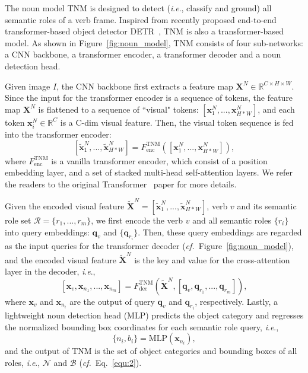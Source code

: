 \documentclass[letterpaper]{article} %
\newcommand{\ie}{\textit{i}.\textit{e}.}
\newcommand{\cf}{\textit{cf.}}
\begin{document}
The noun model TNM is designed to detect (\ie, classify and ground) all semantic roles of a verb frame. Inspired from recently proposed end-to-end transformer-based object detector DETR~\cite{carion2020end}, TNM is also a transformer-based model. As shown in Figure~\ref{fig:noun_model}, TNM consists of four sub-networks: a CNN backbone, a transformer encoder, a transformer decoder and a noun detection head.

Given image $I$, the CNN backbone first extracts a feature map $\bm{X}^N \in\mathbb{R}^{C \times {H} \times {W}}$. Since the input for the transformer encoder is a sequence of tokens, the feature map $\bm{X}^N$ is flattened to a sequence of ``visual" tokens: $[\bm{x}^N_1, ..., \bm{x}^N_{H*W}]$, and each token $\bm{x}^N_i \in \mathbb{R}^C$ is a C-dim visual feature. Then, the visual token sequence is fed into the transformer encoder:
\begin{equation}
    \left[ \tilde{\bm{x}}^N_1, ..., \tilde{\bm{x}}^N_{H*W} \right] = F^{\text{TNM}}_{\text{enc}} (\left[\bm{x}^N_1, ..., \bm{x}^N_{H*W} \right]),
\end{equation}
where $F^{\text{TNM}}_{\text{enc}}$ is a vanilla transformer encoder, which consist of a position embedding layer, and a set of stacked multi-head self-attention layers. We refer the readers to the original Transformer~\cite{vaswani2017attention} paper for more details.


Given the encoded visual feature $\tilde{\bm{X}}^N = [\tilde{\bm{x}}^N_1, ..., \tilde{\bm{x}}^N_{H*W} ]$, verb $v$ and its semantic role set $\mathcal{R}=\{r_1,...,r_m\}$, we first encode the verb $v$ and all semantic roles $\{r_i\}$ into query embeddings: $\bm{q}_v$ and $\{\bm{q}_{r_i}\}$. Then, these query embeddings are regarded as the input queries for the transformer decoder (\cf~Figure~\ref{fig:noun_model}), and the encoded visual feature $\tilde{\bm{X}}^N$ is the key and value for the cross-attention layer in the decoder, \ie, 
\begin{equation} \label{equ:4}
    [\bm{x}_v, \bm{x}_{n_1}, ..., \bm{x}_{n_m}] = F^{\text{TNM}}_{\text{dec}} (\tilde{\bm{X}}^N, [\bm{q}_v, \bm{q}_{r_1}, ..., \bm{q}_{r_m}]),
\end{equation}
where $\bm{x}_v$ and $\bm{x}_{n_i}$ are the output of query $\bm{q}_v$ and $\bm{q}_{r_i}$, respectively. Lastly, a lightweight noun detection head (MLP) predicts the object category and regresses the normalized bounding box coordinates for each semantic role query, \ie, 
\begin{equation}
    \{n_i, b_i\} = \text{MLP}(\bm{x}_{n_i}),
\end{equation}
and the output of TNM is the set of object categories and bounding boxes of all roles, \ie, $\mathcal{N}$ and $\mathcal{B}$ (\cf~Eq.~\eqref{equ:2}).
\end{document}
